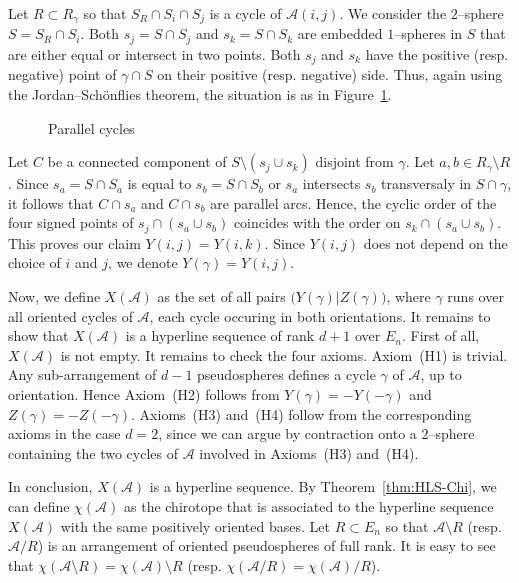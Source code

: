 \documentclass[a4paper]{amsart}
\theoremstyle{definition}
\theoremstyle{remark}
\begin{document}
Let $R\subset R_\gamma$ so that $S_R\cap S_i\cap S_j$ is a cycle of
$\mathcal A(i,j)$. We consider the $2$--sphere $S=S_R\cap S_i$. Both
$s_j=S\cap S_j$ and $s_k=S\cap S_k$ are embedded $1$--spheres in $S$
that are either equal or intersect in two points. Both $s_j$ and $s_k$
have the positive (resp. negative) point of $\gamma\cap S$ on their
positive (resp. negative) side. Thus, again using the
Jordan--Sch\"onflies theorem, the situation is as in Figure~\ref{fig:parallel}.
\begin{figure}[htbp]
  \begin{center}
    \caption{Parallel cycles}
    \label{fig:parallel}
  \end{center}
\end{figure}
%
Let $C$ be a connected component of $S\setminus (s_j\cup s_k)$ disjoint
from $\gamma$. Let $a,b\in R_\gamma\setminus R$.  
%
Since $s_a=S\cap S_a$ is equal to $s_b=S\cap S_b$ or $s_a$ intersects
$s_b$ transversaly in $S\cap \gamma$, it follows that $C\cap s_a$ and
$C\cap s_b$ are parallel arcs. Hence, the cyclic order of the four
signed points of $s_j\cap (s_a\cup s_b)$ coincides with the order on
$s_k\cap (s_a\cup s_b)$. This proves our claim $Y(i,j)=Y(i,k)$.
Since  $Y(i,j)$ does not depend on the choice of $i$ and $j$, we denote
$Y(\gamma)=Y(i,j)$. 

Now, we define $X(\mathcal A)$ as the set of all pairs
$\big(Y(\gamma)|Z(\gamma)\big)$, where $\gamma$ runs over all oriented
cycles of $\mathcal A$, each cycle occuring in both orientations.
%
It remains to show that $X(\mathcal A)$ is a hyperline sequence of rank
$d+1$ over $E_n$. 
First of all, $X(\mathcal A)$ is not empty. It remains to check the four
axioms.
Axiom~(H1) is trivial.
Any sub-arrangement of $d-1$ pseudospheres defines a cycle $\gamma$ of
$\mathcal A$, up to orientation. Hence Axiom~(H2) follows from
$Y(\gamma)= - Y(-\gamma)$ and $Z(\gamma)= -Z(-\gamma)$.
Axioms~(H3) and~(H4) follow from the corresponding axioms in the case
$d=2$, since we can argue by contraction onto a $2$--sphere containing
the two cycles of $\mathcal A$ involved in Axioms~(H3) and~(H4).

In conclusion, $X(\mathcal A)$ is a hyperline sequence. By
Theorem~\ref{thm:HLS-Chi}, we can define $\chi(\mathcal A)$ as the
chirotope that is associated to the hyperline sequence $X(\mathcal
A)$ with the same positively oriented bases.  Let $R\subset E_n$ so
that $\mathcal A\setminus R$ (resp. $\mathcal A/R$) is an arrangement
of oriented pseudospheres of full rank. It is easy to see that
$\chi(\mathcal A\setminus R) = \chi(\mathcal A)\setminus R$ (resp.
$\chi(\mathcal A/R) = \chi(\mathcal A)/R$).
\end{document}
